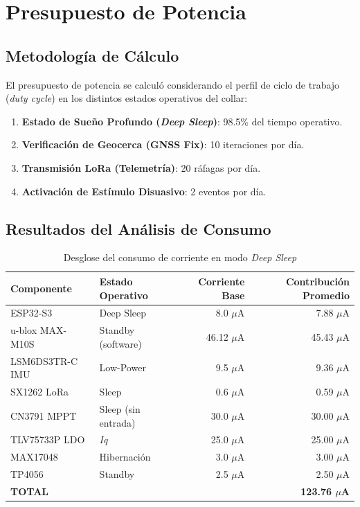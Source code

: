 \section{Presupuesto de Potencia}

\subsection{Metodología de Cálculo}

El presupuesto de potencia se calculó considerando el perfil de ciclo de trabajo (\textit{duty cycle}) en los distintos estados operativos del collar:

\begin{enumerate}[leftmargin=*]
    \item \textbf{Estado de Sueño Profundo (\textit{Deep Sleep})}: 98.5\% del tiempo operativo.
    \item \textbf{Verificación de Geocerca (GNSS Fix)}: 10 iteraciones por día.
    \item \textbf{Transmisión LoRa (Telemetría)}: 20 ráfagas por día.
    \item \textbf{Activación de Estímulo Disuasivo}: 2 eventos por día.
\end{enumerate}

\subsection{Resultados del Análisis de Consumo}

\begin{table}[H]
\centering
\caption{Desglose del consumo de corriente en modo \textit{Deep Sleep}}
\label{tab:power_deepsleep}
\vspace{2mm}
\begin{tabularx}{\textwidth}{X l r r}
\toprule
\rowcolor{categorybg}
\textbf{Componente} & \textbf{Estado Operativo} & \textbf{Corriente Base} & \textbf{Contribución Promedio} \\
\midrule
ESP32-S3 & Deep Sleep & 8.0 $\mu$A & 7.88 $\mu$A \\
\rowcolor{rowalt}
u-blox MAX-M10S & Standby (software) & 46.12 $\mu$A & 45.43 $\mu$A \\
LSM6DS3TR-C IMU & Low-Power & 9.5 $\mu$A & 9.36 $\mu$A \\
\rowcolor{rowalt}
SX1262 LoRa & Sleep & 0.6 $\mu$A & 0.59 $\mu$A \\
CN3791 MPPT & Sleep (sin entrada) & 30.0 $\mu$A & 30.00 $\mu$A \\
\rowcolor{rowalt}
TLV75733P LDO & \textit{Iq} & 25.0 $\mu$A & 25.00 $\mu$A \\
MAX17048 & Hibernación & 3.0 $\mu$A & 3.00 $\mu$A \\
\rowcolor{rowalt}
TP4056 & Standby & 2.5 $\mu$A & 2.50 $\mu$A \\
\midrule
\textbf{TOTAL} & & & \textbf{123.76 $\mu$A} \\
\bottomrule
\end{tabularx}
\end{table}

